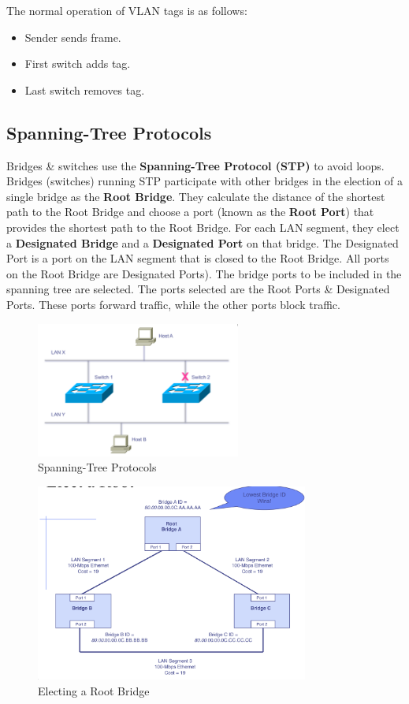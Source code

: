 \documentclass[a4paper,11pt]{article}
\begin{document}
The normal operation of VLAN tags is as follows:
\begin{itemize}
    \item   Sender sends frame.
    \item   First switch adds tag.
    \item   Last switch removes tag.
\end{itemize}

\subsection{Spanning-Tree Protocols}
Bridges \& switches use the \textbf{Spanning-Tree Protocol (STP)} to avoid loops.
Bridges (switches) running STP participate with other bridges in the election of a single bridge as the \textbf{Root Bridge}.
They calculate the distance of the shortest path to the Root Bridge and choose a port (known as the \textbf{Root Port}) 
that provides the shortest path to the Root Bridge. 
For each LAN segment, they elect a \textbf{Designated Bridge} and a \textbf{Designated Port} on that bridge. 
The Designated Port is a port on the LAN segment that is closed to the Root Bridge. 
All ports on the Root Bridge are Designated Ports).
The bridge ports to be included in the spanning tree are selected. 
The ports selected are the Root Ports \& Designated Ports. 
These ports forward traffic, while the other ports block traffic.
\begin{figure}[H]
    \centering
    \includegraphics[width=0.6\textwidth]{./images/stp.png}
    \caption{Spanning-Tree Protocols}
\end{figure}

\begin{figure}[H]
    \centering
    \includegraphics[width=0.8\textwidth]{./images/electing_root.png}
    \caption{Electing a Root Bridge}
\end{figure}
\end{document}
